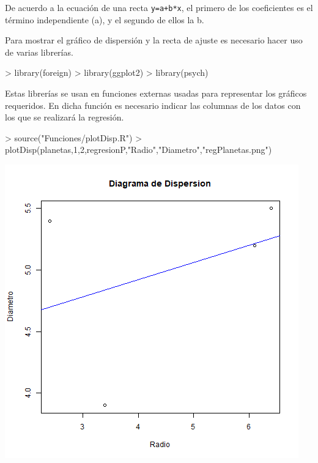 \documentclass [a4paper] {article}
\begin{document}
\bigskip
De acuerdo a la ecuación de una recta \texttt{y=a+b*x}, el primero de los coeficientes es el término independiente (a), y el segundo
de ellos la b.

\bigskip
Para mostrar el gráfico de dispersión y la recta de ajuste es necesario hacer uso de varias librerías.
\begin{Schunk}
\begin{Sinput}
> library(foreign)
> library(ggplot2)
> library(psych)
\end{Sinput}
\end{Schunk}

\bigskip
Estas librerías se usan en funciones externas usadas para representar los gráficos requeridos. En dicha función es necesario
indicar las columnas de los datos con los que se realizará la regresión.
\begin{Schunk}
\begin{Sinput}
> source("Funciones/plotDisp.R")
> plotDisp(planetas,1,2,regresionP,"Radio","Diametro","regPlanetas.png")
\end{Sinput}
\end{Schunk}
\includegraphics[width=\textwidth]{regPlanetas}

\end{document}
